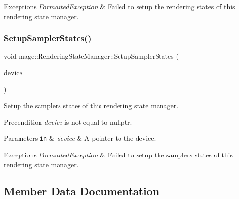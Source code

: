 \begin{DoxyExceptions}{Exceptions}
{\em \hyperlink{classmage_1_1_formatted_exception}{Formatted\+Exception}} & Failed to setup the rendering states of this rendering state manager. \\
\hline
\end{DoxyExceptions}
\hypertarget{classmage_1_1_rendering_state_manager_ae567fc70128f8fa58b2ac0b63b0c636f}{}\label{classmage_1_1_rendering_state_manager_ae567fc70128f8fa58b2ac0b63b0c636f} 
\subsubsection{\texorpdfstring{Setup\+Sampler\+States()}{SetupSamplerStates()}}
{\footnotesize\ttfamily void mage\+::\+Rendering\+State\+Manager\+::\+Setup\+Sampler\+States (\begin{DoxyParamCaption}\item[{I\+D3\+D11\+Device5 $\ast$}]{device }\end{DoxyParamCaption})\hspace{0.3cm}{\ttfamily [private]}}

Setup the samplers states of this rendering state manager.

\begin{DoxyPrecond}{Precondition}
{\itshape device} is not equal to {\ttfamily nullptr}. 
\end{DoxyPrecond}

\begin{DoxyParams}[1]{Parameters}
\mbox{\tt in}  & {\em device} & A pointer to the device. \\
\hline
\end{DoxyParams}

\begin{DoxyExceptions}{Exceptions}
{\em \hyperlink{classmage_1_1_formatted_exception}{Formatted\+Exception}} & Failed to setup the samplers states of this rendering state manager. \\
\hline
\end{DoxyExceptions}


\subsection{Member Data Documentation}
\hypertarget{classmage_1_1_rendering_state_manager_ad50dc7c990bf42580e511c55684e6630}{}\label{classmage_1_1_rendering_state_manager_ad50dc7c990bf42580e511c55684e6630} 
